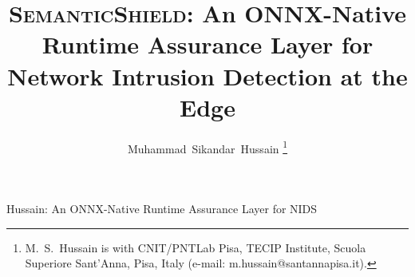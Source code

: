 \documentclass[journal]{IEEEtran}
\newcommand{\sysname}{\textsc{SemanticShield}}
\begin{document}
\title{\sysname{}: An ONNX-Native Runtime Assurance Layer for Network Intrusion Detection at the Edge}

\author{Muhammad~Sikandar~Hussain%
  \thanks{M.~S.~Hussain is with CNIT/PNTLab Pisa, TECIP Institute, Scuola Superiore Sant'Anna, Pisa, Italy (e-mail: m.hussain@santannapisa.it).}%
}

%
{Hussain: An ONNX-Native Runtime Assurance Layer for NIDS}

\maketitle

\end{document}
